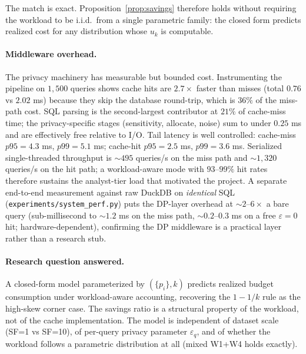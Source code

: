 \documentclass[sigconf,nonacm]{acmart}
\newcommand{\eps}{\varepsilon}
\begin{document}
The match is exact. Proposition~\ref{prop:savings} therefore holds without requiring the workload to be i.i.d.\ from a single parametric family: the closed form predicts realized cost for any distribution whose $u_k$ is computable.

\paragraph{Middleware overhead.}
The privacy machinery has measurable but bounded cost. Instrumenting the pipeline on $1{,}500$ queries shows cache hits are $2.7\times$ faster than misses (total $0.76$ vs $2.02$ ms) because they skip the database round-trip, which is $36\%$ of the miss-path cost. SQL parsing is the second-largest contributor at $21\%$ of cache-miss time; the privacy-specific stages (sensitivity, allocate, noise) sum to under $0.25$ ms and are effectively free relative to I/O. Tail latency is well controlled: cache-miss $p95 = 4.3$ ms, $p99 = 5.1$ ms; cache-hit $p95 = 2.5$ ms, $p99 = 3.6$ ms. Serialized single-threaded throughput is $\sim 495$ queries/s on the miss path and $\sim 1{,}320$ queries/s on the hit path; a workload-aware mode with $93$--$99\%$ hit rates therefore sustains the analyst-tier load that motivated the project. A separate end-to-end measurement against raw DuckDB on \emph{identical} SQL (\texttt{experiments/system\_perf.py}) puts the DP-layer overhead at $\sim 2$--$6\times$ a bare query (sub-millisecond to ${\sim}1.2$ ms on the miss path, ${\sim}0.2$--$0.3$ ms on a free $\eps{=}0$ hit; hardware-dependent), confirming the DP middleware is a practical layer rather than a research stub.


\paragraph{Research question answered.} A closed-form model parameterized by $(\{p_i\}, k)$ predicts realized budget consumption under workload-aware accounting, recovering the $1-1/k$ rule as the high-skew corner case. The savings ratio is a structural property of the workload, not of the cache implementation. The model is independent of dataset scale (SF=1 vs SF=10), of per-query privacy parameter $\eps_q$, and of whether the workload follows a parametric distribution at all (mixed W1+W4 holds exactly).
\end{document}
